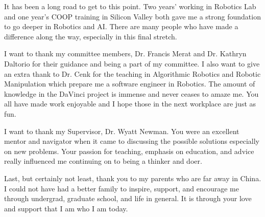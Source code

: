 \begin{sloppypar}

It has been a long road to get to this point. Two years' working in Robotics Lab and one year's COOP training in Silicon Valley both gave me a strong foundation to go deeper in Robotics and AI. There are many people who have made a difference along the way, especially in this final stretch.

I want to thank my committee members, Dr. Francis Merat and Dr. Kathryn Daltorio for their guidance and being a part of my committee. I also want to give an extra thank to Dr. Cenk for the teaching in Algorithmic Robotics and Robotic Manipulation which prepare me a software engineer in Robotics. The amount of knowledge in the DaVinci project is immense and never ceases to amaze me. You all have made work enjoyable and I hope those in the next workplace are just as fun.

I want to thank my Supervisor, Dr. Wyatt Newman. You were an excellent mentor and navigator when it came to discussing the possible solutions especially on new problems. Your passion for teaching, emphasis on education, and advice really influenced me continuing on to being a thinker and doer.

Last, but certainly not least, thank you to my parents who are far away in China. I could not have had a better family to inspire, support, and encourage me through undergrad, graduate school, and life in general. It is through your love and support that I am who I am today.

\end{sloppypar}